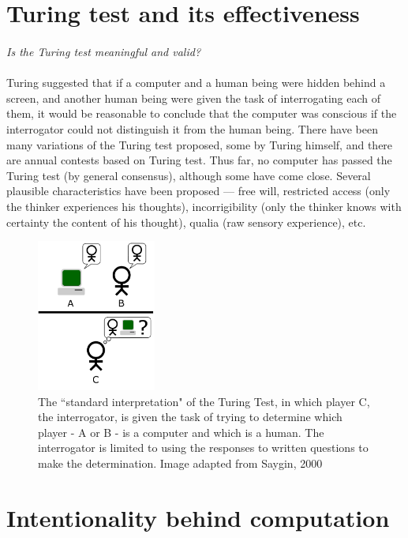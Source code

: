 \documentclass[a4paper]{article}
\begin{document}
	\section{Turing test and its effectiveness}
	\paragraph{}
	\textit{Is the Turing test\cite{turing50} meaningful and valid?}
	\paragraph{}
	Turing suggested that if a computer and a human being were hidden behind a screen, and another
	human being were given the task of interrogating each of them, it would be reasonable to conclude that the computer was conscious if the interrogator could not distinguish it
	from the human being. There have been many variations of the Turing test proposed, some by Turing himself, and there are annual contests based on Turing test. Thus far, no computer has
	passed the Turing test (by general consensus), although some have come close. Several plausible characteristics have been proposed — free will, restricted access (only the thinker experiences his thoughts), incorrigibility (only the thinker knows with certainty the content of his thought), qualia (raw sensory experience), etc.
		\begin{figure}
			\centering
			\includegraphics[height=5cm]{Turing_Test}
				\caption{The ``standard interpretation" of the Turing Test, in which player C, the interrogator, is given the task of trying to determine which player - A or B - is a computer and which is a human. The interrogator is limited to using the responses to written questions to make the determination. Image adapted from Saygin, 2000\cite{saygin00}}
		\end{figure}
		
	\section{Intentionality behind computation}
\end{document}
